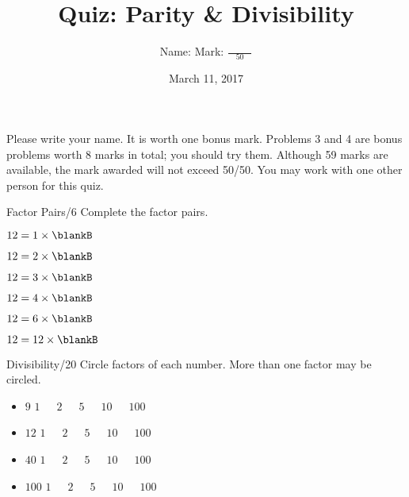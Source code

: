 \documentclass[12pt,letterpaper]{article}
\title{Quiz: Parity \& Divisibility}
\author{Name: \underline{\hspace{5cm}} Mark: $\displaystyle \frac{\hspace{3em}}{50}$}
\date{March 11, 2017}
\begin{document}
\maketitle

Please write your name. It is worth one bonus mark. Problems 3 and 4 are bonus problems
worth 8 marks in total; you should try them. Although 59 marks are available, the mark
awarded will not exceed 50/50. You may work with one other person for this quiz.

\thispagestyle{empty}

\begin{problem}{Factor Pairs\hfill/6}
 Complete the factor pairs.

 \begin{itemize}
  \begin{multicols}{2}
   \item $12 = 1 \times \blankB$
   \item $12 = 2 \times \blankB$
   \item $12 = 3 \times \blankB$
   \item $12 = 4 \times \blankB$
   \item $12 = 6 \times \blankB$
   \item $12 = 12 \times \blankB$
  \end{multicols}
 \end{itemize}

\end{problem}

\begin{problem}{Divisibility\hfill/20}
 Circle factors of each number. More than one factor may be circled.

 \begin{itemize}
  \item $9$ \hfill $1$~~~$2$~~~$5$~~~$10$~~~$100$
  \item $12$ \hfill $1$~~~$2$~~~$5$~~~$10$~~~$100$
  \item $40$ \hfill $1$~~~$2$~~~$5$~~~$10$~~~$100$
  \item $100$ \hfill $1$~~~$2$~~~$5$~~~$10$~~~$100$
 \end{itemize}
\end{problem}
\end{document}
